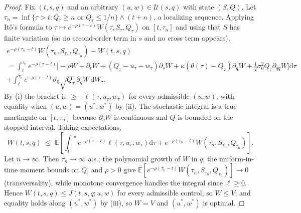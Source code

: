 \documentclass[10pt,a4paper]{amsart}
\newcommand{\E}{\mathbb{E}}
\newcommand{\dif}{\mathrm{d}}
\begin{document}
\begin{proof}
Fix $(t,s,q)$ and an arbitrary $(u,w)\in\mathcal U(s,q)$ with state
$(S,Q)$. Let $\tau_n=\inf\{\tau>t: Q_\tau\ge n \text{ or } Q_\tau\le 1/n\}
\wedge (t+n)$, a localizing sequence. Applying It\^o's formula to
$\tau\mapsto e^{-\rho(\tau-t)}W(\tau,S_\tau,Q_\tau)$ on $[t,\tau_n]$ and
using that $S$ has finite variation (so no second-order term in $s$ and no
cross term appears),
\begin{multline*}
e^{-\rho(\tau_n-t)}W(\tau_n,S_{\tau_n},Q_{\tau_n}) - W(t,s,q) \\
= \int_t^{\tau_n} e^{-\rho(\tau-t)}\Big[
-\rho W + \partial_t W + (Q_\tau-u_\tau-w_\tau)\partial_s W
+ \kappa(\theta(\tau)-Q_\tau)\partial_q W
+ \tfrac12\sigma_0^2 Q_\tau \partial_{qq}W \Big]\dif\tau \\
+ \int_t^{\tau_n} e^{-\rho(\tau-t)}\sigma_0\sqrt{Q_\tau}\,\partial_q W\,\dif W_\tau .
\end{multline*}
By (i) the bracket is $\ge -\ell(\tau,u_\tau,w_\tau)$ for every admissible
$(u,w)$, with equality when $(u,w)=(u^*,w^*)$ by (ii). The stochastic
integral is a true martingale on $[t,\tau_n]$ because $\partial_q W$ is
continuous and $Q$ is bounded on the stopped interval. Taking expectations,
\[
W(t,s,q) \;\le\; \E\!\left[\int_t^{\tau_n} e^{-\rho(\tau-t)}
\ell(\tau,u_\tau,w_\tau)\dif\tau
+ e^{-\rho(\tau_n-t)}W(\tau_n,S_{\tau_n},Q_{\tau_n})\right].
\]
Let $n\to\infty$. Then $\tau_n\to\infty$ a.s.; the polynomial growth of $W$
in $q$, the uniform-in-time moment bounds on $Q$, and $\rho>0$ give
$\E[e^{-\rho(\tau_n-t)}W(\tau_n,S_{\tau_n},Q_{\tau_n})]\to0$ (transversality),
while monotone convergence handles the integral since $\ell\ge0$. Hence
$W(t,s,q)\le J(t,s,q;u,w)$ for every admissible control, so
$W\le V$; and equality holds along $(u^*,w^*)$ by (iii), so $W=V$ and
$(u^*,w^*)$ is optimal.
\end{proof}
\end{document}

